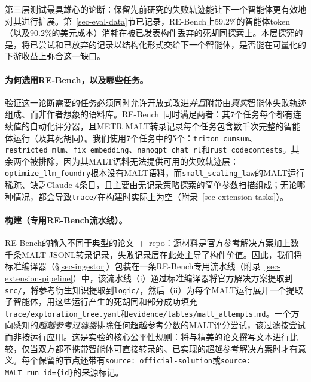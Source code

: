 第三层测试\ara{}最具雄心的论断：保留先前研究的失败轨迹能让下一个智能体更有效地对其进行扩展。第~\ref{sec-eval-data}节已记录，RE-Bench上59.2\%的智能体token（以及90.2\%的美元成本）消耗在被已发表构件丢弃的死胡同探索上。本层探究的是，将已尝试和已放弃的记录以结构化形式交给下一个智能体，是否能在可量化的下游收益上弥合这一缺口。

\paragraph{为何选用RE-Bench，以及哪些任务。}
验证这一论断需要的任务必须同时允许开放式改进\emph{并且}附带由\emph{真实}智能体失败轨迹组成、而非作者想象的语料库。RE-Bench~\citep{wijk2025rebench}同时满足两者：其7个任务每个都有连续值的自动化评分器，且METR MALT转录记录每个任务包含数千次完整的智能体运行（及其死胡同）。我们使用7个任务中的5个：\texttt{triton\_cumsum}、\texttt{restricted\_mlm}、\texttt{fix\_embedding}、\texttt{nanogpt\_chat\_rl}和\texttt{rust\_codecontests}。其余两个被排除，因为其MALT语料无法提供可用的失败轨迹层：\texttt{optimize\_llm\_foundry}根本没有MALT语料，而\texttt{small\_scaling\_law}的MALT运行稀疏、缺乏Claude-4条目，且主要由无记录策略探索的简单参数扫描组成；无论哪种情况，都会导致\texttt{trace/}在构建时实际上为空（附录~\ref{sec-extension-tasks}）。

\paragraph{\ara{}构建（专用RE-Bench流水线）。}
RE-Bench的输入不同于典型的论文~+~repo：源材料是官方参考解决方案加上数千条MALT JSONL转录记录，失败记录层在此处主导了构件价值。因此，我们将标准\ara{}编译器（\S\ref{sec-ingestor}）包装在一条RE-Bench专用流水线（附录~\ref{sec-extension-pipeline}）中，该流水线（i）通过标准编译器将官方解决方案提取到\texttt{src/}，将参考衍生知识提取到\texttt{logic/}，然后（ii）为每个MALT运行展开一个提取子智能体，用这些运行产生的死胡同和部分成功填充\texttt{trace/exploration\_tree.yaml}和\texttt{evidence/tables/malt\_attempts.md}。一个方向感知的\emph{超越参考过滤器}排除任何超越参考分数的MALT评分尝试，该过滤按尝试而非按运行应用。这是实验的核心公平性规则：将\ara{}与精美的论文撰写文本进行比较，仅当双方都不携带智能体可直接转录的、已实现的超越参考解决方案时才有意义。每个保留的节点还带有\texttt{source: official-solution}或\texttt{source: MALT~run\_id=\{id\}}的来源标记。

